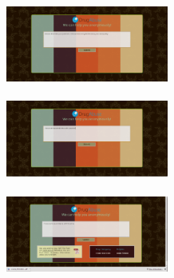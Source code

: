 \documentclass[a4paper,12pt, twocolumn]{article}
\begin{document}
\begin{center}
\includegraphics[width=0.4\textwidth]{images/WebHomeScreen.png}
\label{web_home}
~\\~\\

\includegraphics[width=0.4\textwidth]{images/WebProblemDescription.png}
\label{web_problem}
~\\~\\

\includegraphics[width=0.4\textwidth]{images/WebProblemSolution.png}
\label{web_solution}

\end{center}

\end{document}

